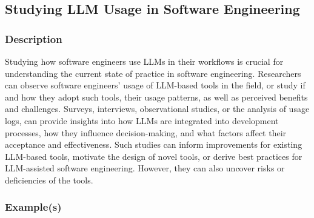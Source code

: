 \subsection{Studying LLM Usage in Software Engineering}

\subsubsection{Description}

Studying how software engineers use LLMs in their workflows is crucial for understanding the current state of practice in software engineering.
Researchers can observe software engineers' usage of LLM-based tools in the field, or study if and how they adopt such tools, their usage patterns, as well as perceived benefits and challenges.
Surveys, interviews, observational studies, or the analysis of usage logs, can provide insights into how LLMs are integrated into development processes, how they influence decision-making, and what factors affect their acceptance and effectiveness. 
Such studies can inform improvements for existing LLM-based tools, motivate the design of novel tools, or derive best practices for LLM-assisted software engineering.
However, they can also uncover risks or deficiencies of the tools.

\subsubsection{Example(s)}

